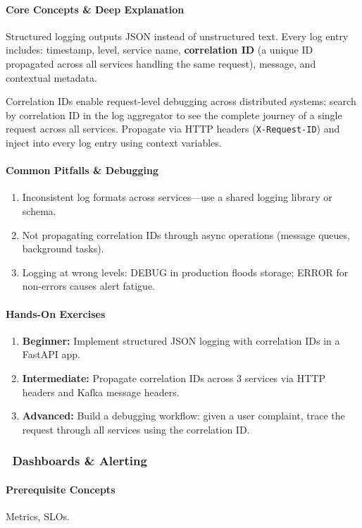 \documentclass[11pt, a4paper, oneside]{report}
\newcommand{\mustmaster}[1]{\subsubsection{\texorpdfstring{\fcolorbox{blue!40!black}{blue!8}{\footnotesize\bfseries\color{blue!40!black} MUST MASTER}~#1}{#1}}}
\begin{document}
\paragraph{Core Concepts \& Deep Explanation} Structured logging outputs JSON instead of unstructured text. Every log entry includes: timestamp, level, service name, \textbf{correlation ID} (a unique ID propagated across all services handling the same request), message, and contextual metadata.

Correlation IDs enable request-level debugging across distributed systems: search by correlation ID in the log aggregator to see the complete journey of a single request across all services. Propagate via HTTP headers (\texttt{X-Request-ID}) and inject into every log entry using context variables.

\paragraph{Common Pitfalls \& Debugging}
\begin{enumerate}[leftmargin=*]
\item Inconsistent log formats across services---use a shared logging library or schema.
\item Not propagating correlation IDs through async operations (message queues, background tasks).
\item Logging at wrong levels: DEBUG in production floods storage; ERROR for non-errors causes alert fatigue.
\end{enumerate}

\paragraph{Hands-On Exercises}
\begin{enumerate}[leftmargin=*]
\item \textbf{Beginner:} Implement structured JSON logging with correlation IDs in a FastAPI app.
\item \textbf{Intermediate:} Propagate correlation IDs across 3 services via HTTP headers and Kafka message headers.
\item \textbf{Advanced:} Build a debugging workflow: given a user complaint, trace the request through all services using the correlation ID.
\end{enumerate}

\mustmaster{Dashboards \& Alerting}

\paragraph{Prerequisite Concepts} Metrics, SLOs.
\end{document}
